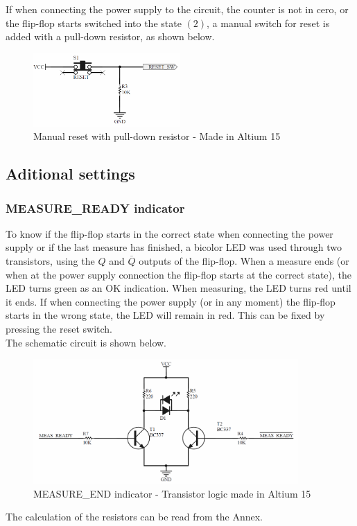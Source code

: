 If when connecting the power supply to the circuit, the counter is not in cero, or the flip-flop starts 
switched into the state $(2)$, a manual switch for reset is added with a pull-down resistor, as shown below.

\begin{figure}[H]
    \begin{centering}
    \includegraphics[width=0.5\textwidth]{pullDown_Switch}
    \par\end{centering}
    \caption{Manual reset with pull-down resistor - Made in Altium 15}
\end{figure}

\subsection*{Aditional settings}
\subsubsection*{MEASURE\_READY indicator}

To know if the flip-flop starts in the correct state when connecting the power supply or 
if the last measure has finished, 
a bicolor LED was used through two transistors, using the $Q$ and $\overline{Q}$ outputs 
of the flip-flop. When a measure ends (or when at the power supply connection the flip-flop starts
at the correct state), the LED turns green as an OK indication. When measuring, the LED turns red until
it ends. If when connecting the power supply (or in any moment) the flip-flop starts in the 
wrong state, the LED will remain in red. This can be fixed by pressing the reset switch.\\
The schematic circuit is shown below.

\begin{figure}[H]
    \begin{centering}
    \includegraphics[width=0.9\textwidth]{Transistor_LogicLED}
    \par\end{centering}
    \caption{MEASURE\_END indicator - Transistor logic made in Altium 15}
\end{figure}
The calculation of the resistors can be read from the Annex.

